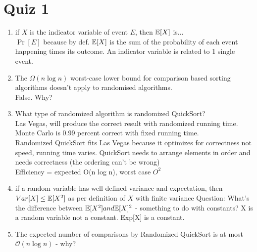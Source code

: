\newenvironment{QandA}{\begin{enumerate}[label=\bfseries\alph*.,leftmargin=2em,rightmargin=2em]\bfseries}
    {\end{enumerate}}
\newenvironment{answered}{\par\normalfont}{}

\section*{Quiz 1}
\begin{enumerate}
    \item if $X$ is the indicator variable of event $E$, then $\mathbb{E}[X]$ is...  \\
    $\Pr[E]$ because by def. $\mathbb{E}[X]$ is the sum of the probability of each event happening times its outcome. An indicator variable is related to 1 single event.
    
    \item The $\Omega(n\log n)$ worst-case lower bound for comparison based sorting algorithms doesn't apply to randomised algorithms. \\
    False. Why? \\

    \item What type of randomized algorithm is randomized QuickSort? \\
    Las Vegas, will produce the correct result with randomized running time. Monte Carlo is 0.99 percent correct with fixed running time. \\
    Randomized QuickSort fits Las Vegas because it optimizes for correctness not speed, running time varies.
    QuickSort needs to arrange elements in order and needs correctness (the ordering can't be wrong) \\
    Efficiency = expected O(n log n), worst case $O^2$ 

    \item if a random variable has well-defined variance and expectation, then \\
    $Var[X] \leq \mathbb{E}[X^2]$ as per definition of $X$ with finite variance
    Question: What's the difference between $\mathbb{E}[X^2] and \mathbb{E}[X]^2$ - something to do with constants?
    X is a random variable not a constant. Exp[X] is a constant.

    \item The expected number of comparisons by Randomized QuickSort is at most \\
    $\mathcal{O}(n \log n)$ - why?


\end{enumerate}
